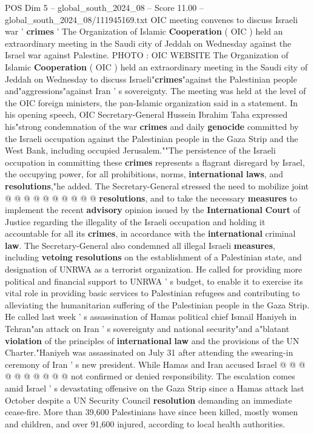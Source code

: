 \begin{textsample}{POS Dim 5 – global\_south\_2024\_08 – Score 11.00 – global\_south\_2024\_08/111945169.txt}  \label{ex:f5_pos_289}
OIC meeting convenes to discuss Israeli war ' \textbf{crimes} ' The Organization of Islamic \textbf{Cooperation} ( OIC ) held an extraordinary meeting in the Saudi city of Jeddah on Wednesday against the Israel war against Palestine.
PHOTO : OIC WEBSITE The Organization of Islamic \textbf{Cooperation} ( OIC ) held an extraordinary meeting in the Saudi city of Jeddah on Wednesday to discuss Israeli"\textbf{crimes}"against the Palestinian people and"aggressions"against Iran ' s sovereignty.
The meeting was held at the level of the OIC foreign ministers, the pan-Islamic organization said in a statement.
In his opening speech, OIC Secretary-General Hussein Ibrahim Taha expressed his"strong condemnation of the war \textbf{crimes} and daily \textbf{genocide} committed by the Israeli occupation against the Palestinian people in the Gaza Strip and the West Bank, including occupied Jerusalem.""The persistence of the Israeli occupation in committing these \textbf{crimes} represents a flagrant disregard by Israel, the occupying power, for all prohibitions, norms, \textbf{international} \textbf{laws}, and \textbf{resolutions},"he added.
The Secretary-General stressed the need to mobilize joint @ @ @ @ @ @ @ @ @ @ \textbf{resolutions}, and to take the necessary \textbf{measures} to implement the recent \textbf{advisory} opinion issued by the \textbf{International} \textbf{Court} of Justice regarding the illegality of the Israeli occupation and holding it accountable for all its \textbf{crimes}, in accordance with the \textbf{international} criminal \textbf{law}.
The Secretary-General also condemned all illegal Israeli \textbf{measures}, including \textbf{vetoing} \textbf{resolutions} on the establishment of a Palestinian state, and designation of UNRWA as a terrorist organization.
He called for providing more political and financial support to UNRWA ' s budget, to enable it to exercise its vital role in providing basic services to Palestinian refugees and contributing to alleviating the humanitarian suffering of the Palestinian people in the Gaza Strip.
He called last week ' s assassination of Hamas political chief Ismail Haniyeh in Tehran"an attack on Iran ' s sovereignty and national security"and a"blatant \textbf{violation} of the principles of \textbf{international} \textbf{law} and the provisions of the UN Charter."Haniyeh was assassinated on July 31 after attending the swearing-in ceremony of Iran ' s new president.
While Hamas and Iran accused Israel @ @ @ @ @ @ @ @ @ @ not confirmed or denied responsibility.
The escalation comes amid Israel ' s devastating offensive on the Gaza Strip since a Hamas attack last October despite a UN Security Council \textbf{resolution} demanding an immediate cease-fire.
More than 39,600 Palestinians have since been killed, mostly women and children, and over 91,600 injured, according to local health authorities.

\end{textsample}

